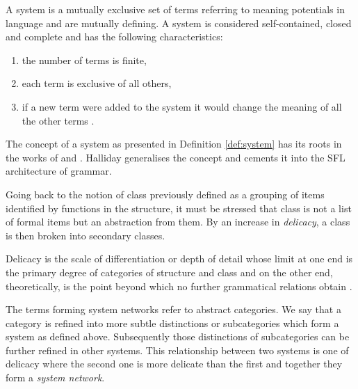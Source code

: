     \begin{definition}[System]\label{def:system}
    	A system is a mutually exclusive set of terms referring to meaning potentials in language and are mutually defining. A system is considered self-contained, closed and complete and has the following characteristics:
    	\begin{enumerate}
    		\item the number of terms is finite,
    		\item each term is exclusive of all others,
    		\item if a new term were added to the system it would change the meaning of all the other terms \citep[41]{Halliday2002}.
    	\end{enumerate}
    \end{definition}

    The concept of a system as presented in Definition \ref{def:system} has its roots in the works of \citet{Saussure15} and \citet{Hjelmslev53}. Halliday generalises the concept and  cements it into the SFL architecture of grammar. 
    
    Going back to the notion of class previously defined as a grouping of items identified by functions in the structure, it must be stressed that class is not a list of formal items but an abstraction from them. By an increase in \textit{delicacy}, a class is then broken into secondary classes. 
    
    \begin{definition}[Delicacy]\label{def:delicacy-sydney}
    	Delicacy is the scale of differentiation or depth of detail whose limit at one end is the primary degree of categories of structure  and class and on the other end, theoretically, is the point beyond which no further grammatical relations obtain \citep[58]{Halliday2002}.
    \end{definition}
    
    The terms forming system networks refer to abstract categories. We say that a category is refined into more subtle distinctions or subcategories which form a system as defined above. Subsequently those distinctions of subcategories can be further refined in other systems. This relationship between two systems is one of delicacy where the second one is more delicate than the first and together they form a \textit{system network}. 

